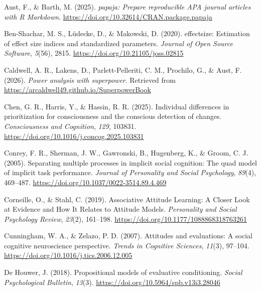 \documentclass[
  man,floatsintext]{apa6}
\newlength{\cslhangindent}
\newlength{\cslentryspacingunit} %
\newenvironment{CSLReferences}[2] %
 {%
  \setlength{\parindent}{0pt}
  \ifodd #1
  \let\oldpar\par
  \def\par{\hangindent=\cslhangindent\oldpar}
  \fi
  \setlength{\parskip}{#2\cslentryspacingunit}
 }%
 {}
\begin{document}
\hypertarget{refs}{}
\begin{CSLReferences}{1}{0}
\leavevmode{}%
Aust, F., \& Barth, M. (2025). \emph{{papaja}: {Prepare} reproducible {APA} journal articles with {R Markdown}}. \url{https://doi.org/10.32614/CRAN.package.papaja}

\leavevmode{}%
Ben-Shachar, M. S., Lüdecke, D., \& Makowski, D. (2020). {e}ffectsize: Estimation of effect size indices and standardized parameters. \emph{Journal of Open Source Software}, \emph{5}(56), 2815. \url{https://doi.org/10.21105/joss.02815}

\leavevmode{}%
Caldwell, A. R., Lakens, D., Parlett-Pelleriti, C. M., Prochilo, G., \& Aust, F. (2026). \emph{Power analysis with superpower}. Retrieved from \url{https://arcaldwell49.github.io/SuperpowerBook}

\leavevmode{}%
Chen, G. R., Harris, Y., \& Hassin, R. R. (2025). Individual differences in prioritization for consciousness and the conscious detection of changes. \emph{Consciousness and Cognition}, \emph{129}, 103831. \url{https://doi.org/10.1016/j.concog.2025.103831}

\leavevmode{}%
Conrey, F. R., Sherman, J. W., Gawronski, B., Hugenberg, K., \& Groom, C. J. (2005). Separating multiple processes in implicit social cognition: The quad model of implicit task performance. \emph{Journal of Personality and Social Psychology}, \emph{89}(4), 469--487. \url{https://doi.org/10.1037/0022-3514.89.4.469}

\leavevmode{}%
Corneille, O., \& Stahl, C. (2019). Associative {Attitude Learning}: {A Closer Look} at {Evidence} and {How It Relates} to {Attitude Models}. \emph{Personality and Social Psychology Review}, \emph{23}(2), 161--198. \url{https://doi.org/10.1177/1088868318763261}

\leavevmode{}%
Cunningham, W. A., \& Zelazo, P. D. (2007). Attitudes and evaluations: A social cognitive neuroscience perspective. \emph{Trends in Cognitive Sciences}, \emph{11}(3), 97--104. \url{https://doi.org/10.1016/j.tics.2006.12.005}

\leavevmode{}%
De Houwer, J. (2018). Propositional models of evaluative conditioning. \emph{Social Psychological Bulletin}, \emph{13}(3). \url{https://doi.org/10.5964/spb.v13i3.28046}


\end{CSLReferences}
\end{document}
